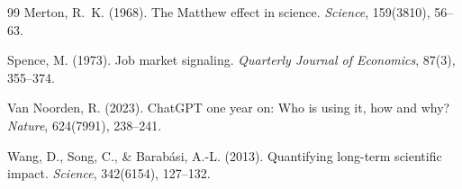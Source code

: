 \documentclass[12pt,a4paper]{article}
\begin{document}
\begin{thebibliography}{99}
Merton, R.~K. (1968).
\newblock The Matthew effect in science.
\newblock \textit{Science}, 159(3810), 56--63.

Spence, M. (1973).
\newblock Job market signaling.
\newblock \textit{Quarterly Journal of Economics}, 87(3), 355--374.

Van Noorden, R. (2023).
\newblock ChatGPT one year on: Who is using it, how and why?
\newblock \textit{Nature}, 624(7991), 238--241.

Wang, D., Song, C., \& Barabási, A.-L. (2013).
\newblock Quantifying long-term scientific impact.
\newblock \textit{Science}, 342(6154), 127--132.

\end{thebibliography}

\newpage
\end{document}
